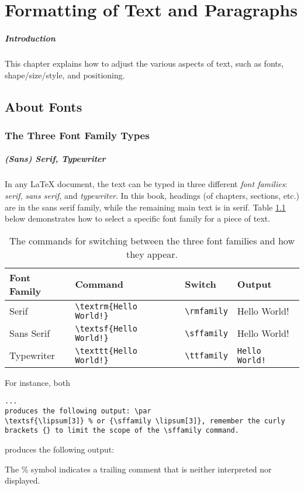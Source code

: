 \chapter{Formatting of Text and Paragraphs}

\paragraph{Introduction} This chapter explains how to adjust the various aspects of text, such as fonts, shape/size/style, and positioning.

\section{About Fonts}

\subsection{The Three Font Family Types}

\paragraph{(Sans) Serif, Typewriter} In any \LaTeX{} document, the text can be typed in three different \textit{font families}: \textit{serif}, \textit{sans serif}, and \textit{typewriter}. In this book, headings (of chapters, sections, etc.) are in the sans serif family, while the remaining main text is in serif. Table \ref{tab:fontfamily} below demonstrates how to select a specific font family for a piece of text.
\begin{table}
\begin{tabularx}{\textwidth}{|l|X|l|l|}
\hline
Font Family & Command & Switch & Output \\
\hline
Serif & \texttt{\textbackslash textrm\{Hello World!\}}& \texttt{\textbackslash rmfamily} & \textrm{Hello World!} \\
\hline
Sans Serif & \texttt{\textbackslash textsf\{Hello World!\}}& \texttt{\textbackslash sffamily} & \textsf{Hello World!} \\
\hline
Typewriter & \texttt{\textbackslash texttt\{Hello World!\}}& \texttt{\textbackslash ttfamily} & \texttt{Hello World!} \\
\hline
\end{tabularx}
\caption{The commands for switching between the three font families and how they appear.}
\label{tab:fontfamily}
\end{table}
For instance, both
\begin{lstlisting}
... 
produces the following output: \par
\textsf{\lipsum[3]} % or {\sffamily \lipsum[3]}, remember the curly brackets {} to limit the scope of the \sffamily command.
\end{lstlisting}
produces the following output: \par
{\sffamily \lipsum[3]} \par
The \% symbol indicates a trailing comment that is neither interpreted nor displayed.

